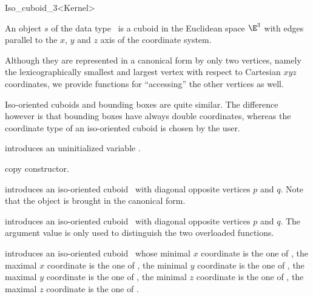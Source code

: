 \begin{ccRefClass} {Iso_cuboid_3<Kernel>}

\ccDefinition  An object $s$ of the data type \ccRefName\ is a
cuboid in the Euclidean space $\E^3$ with edges parallel to the $x$,
$y$ and $z$ axis of the coordinate system.
 
Although they are represented in a canonical form by only two
vertices, namely the lexicographically smallest and largest vertex
with respect to Cartesian $xyz$ coordinates, we provide
functions for ``accessing'' the other vertices as well.

Iso-oriented cuboids and bounding boxes are quite similar. The
difference however is that bounding boxes have always double coordinates, 
whereas the coordinate type of an iso-oriented cuboid is chosen by
the user.

\ccCreation
{}

\ccHidden {}
             {introduces an uninitialized variable \ccVar.}

\ccHidden {}
            {copy constructor.}

            {introduces an iso-oriented cuboid \ccVar\ with diagonal
             opposite vertices $p$ and $q$. Note that the object is 
             brought in the canonical form.}

            {introduces an iso-oriented cuboid \ccVar\ with diagonal
             opposite vertices $p$ and $q$.  The  argument value
             is only used to distinguish the two overloaded functions.
             }

            {introduces an iso-oriented cuboid \ccVar\ whose
             minimal $x$ coordinate is the one of , the
             maximal $x$ coordinate is the one of , the
             minimal $y$ coordinate is the one of , the
             maximal $y$ coordinate is the one of , the
             minimal $z$ coordinate is the one of , the
             maximal $z$ coordinate is the one of .}


\end{ccRefClass}
